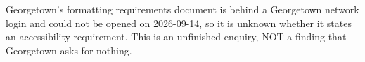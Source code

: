 %
	{Georgetown's formatting requirements document is behind a Georgetown
	 network login and could not be opened on 2026-09-14, so it is unknown
	 whether it states an accessibility requirement. This is an unfinished
	 enquiry, NOT a finding that Georgetown asks for nothing.}

%
\newcommand{\thesis@gt@school}{}
\newcommand{\georgetownschool}[1]{\renewcommand{\thesis@gt@school}{#1}}
\newcommand{\thesis@gt@prior}{}
\newcommand{\georgetownpriordegree}[1]{\renewcommand{\thesis@gt@prior}{#1}}


